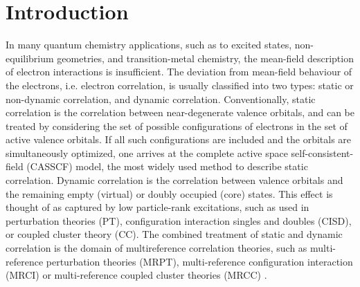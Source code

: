 
\section{Introduction}

In many quantum chemistry applications, such as to excited states, non-equilibrium geometries,
and transition-metal chemistry, the mean-field description of electron interactions is insufficient. 
The deviation from mean-field behaviour of the electrons, i.e. electron correlation, is usually classified
into two types: static or non-dynamic correlation, and dynamic correlation.
Conventionally, static correlation is the correlation between near-degenerate valence orbitals, and can be treated by
considering the set of possible configurations of electrons in the set of active valence orbitals.
If all such configurations are included and the orbitals are simultaneously optimized, one arrives at the complete active space
self-consistent-field (CASSCF) model, the most widely used method to describe static correlation.
Dynamic correlation is the correlation between valence orbitals and the remaining empty (virtual) or doubly occupied (core) states.
This effect is thought of
as captured by low particle-rank excitations, such as used in
perturbation theories (PT), configuration interaction singles  and doubles  (CISD), or coupled cluster theory (CC).
The combined treatment of static and dynamic correlation is the domain of multireference correlation theories, such as
multi-reference perturbation theories (MRPT)\cite{andersson_second-order_1990}, multi-reference configuration interaction (MRCI)\cite{buenker_individualized_1974} or multi-reference coupled cluster theories (MRCC) \cite{oliphant_multireference_1991}.

